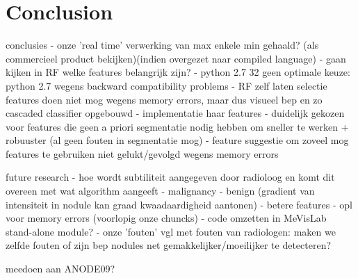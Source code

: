 \section{Conclusion}


conclusies
- onze 'real time' verwerking van max enkele min gehaald? (als commercieel
product bekijken)(indien overgezet naar compiled language)
- gaan kijken in RF welke features belangrijk zijn?
- python 2.7 32 geen optimale keuze: python 2.7 wegens backward compatibility
problems
- RF zelf laten selectie features doen niet mog wegens memory errors, maar dus
visueel bep en zo cascaded classifier opgebouwd
- implementatie haar features
- duidelijk gekozen voor features die geen a priori segmentatie nodig hebben om
sneller te werken + robuuster (al geen fouten in segmentatie mog)
- feature suggestie om zoveel mog features te gebruiken niet gelukt/gevolgd
wegens memory errors






future research
- hoe wordt subtiliteit aangegeven door radioloog en komt dit overeen met wat
algorithm aangeeft
- malignancy - benign (gradient van intensiteit in nodule kan graad
kwaadaardigheid aantonen)
- betere features
- opl voor memory errors (voorlopig onze chuncks)
- code omzetten in MeVisLab stand-alone module?
- onze 'fouten' vgl met fouten van radiologen: maken we zelfde fouten of zijn
bep nodules net gemakkelijker/moeilijker te detecteren?

meedoen aan ANODE09?

